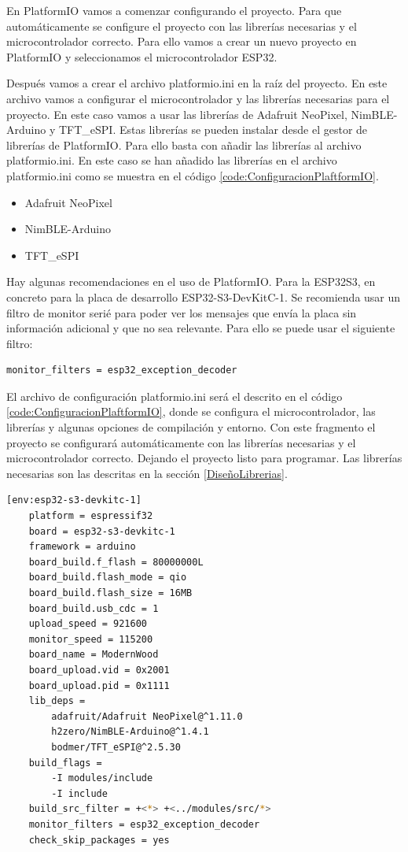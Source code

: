En \gls{PlatformIO} vamos a comenzar configurando el proyecto. Para que automáticamente se configure el proyecto con las librerías necesarias y el microcontrolador correcto. Para ello vamos a crear un nuevo proyecto en \gls{PlatformIO} y seleccionamos el microcontrolador ESP32.

Después vamos a crear el archivo platformio.ini en la raíz del proyecto. En este archivo vamos a configurar el microcontrolador y las librerías necesarias para el proyecto. En este caso vamos a usar las librerías de Adafruit NeoPixel, NimBLE-Arduino y TFT\_eSPI. Estas librerías se pueden instalar desde el gestor de librerías de \gls{PlatformIO}. Para ello basta con añadir las librerías al archivo platformio.ini. En este caso se han añadido las librerías en el archivo platformio.ini como se muestra en el código \ref{code:ConfiguracionPlaftformIO}.

\begin{itemize}
\item Adafruit NeoPixel
\item NimBLE-Arduino
\item TFT\_eSPI
\end{itemize}
\label{LibreriasPlatformIO}

Hay algunas recomendaciones en el uso de \gls{PlatformIO}. Para la ESP32S3, en concreto para la placa de desarrollo ESP32-S3-DevKitC-1. Se recomienda usar un filtro de monitor serié para poder ver los mensajes que envía la placa sin información adicional y que no sea relevante. Para ello se puede usar el siguiente filtro:

\begin{lstlisting}[style=console, language=bash, caption={Filtro recomendado de \gls{PlatformIO}}, label={code:FiltroEspecial}]
monitor_filters = esp32_exception_decoder
\end{lstlisting}
\newpage
El archivo de configuración platformio.ini será el descrito en el código \ref{code:ConfiguracionPlaftformIO}, donde se configura el microcontrolador, las librerías y algunas opciones de compilación y entorno. Con este fragmento el proyecto se configurará automáticamente con las librerías necesarias y el microcontrolador correcto. Dejando el proyecto listo para programar. Las librerías necesarias son las descritas en la sección \ref{DiseñoLibrerias}.

\begin{lstlisting}[style=console, language=bash, caption={Configuracion \gls{PlatformIO}}, label={code:ConfiguracionPlaftformIO}]
    [env:esp32-s3-devkitc-1]
    platform = espressif32
    board = esp32-s3-devkitc-1
    framework = arduino
    board_build.f_flash = 80000000L
    board_build.flash_mode = qio
    board_build.flash_size = 16MB
    board_build.usb_cdc = 1
    upload_speed = 921600
    monitor_speed = 115200
    board_name = ModernWood
    board_upload.vid = 0x2001
    board_upload.pid = 0x1111
    lib_deps = 
        adafruit/Adafruit NeoPixel@^1.11.0
        h2zero/NimBLE-Arduino@^1.4.1
        bodmer/TFT_eSPI@^2.5.30
    build_flags =
        -I modules/include
        -I include
    build_src_filter = +<*> +<../modules/src/*>
    monitor_filters = esp32_exception_decoder
    check_skip_packages = yes
\end{lstlisting}

